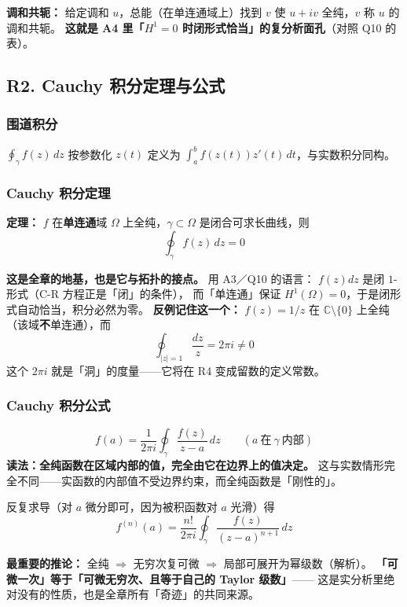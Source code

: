 \textbf{调和共轭：} 给定调和 $u$，总能（在单连通域上）找到 $v$ 使 $u+iv$ 全纯，$v$ 称 $u$ 的调和共轭。
\textbf{这就是 A4 里「$H^1=0$ 时闭形式恰当」的复分析面孔}（对照 Q10 的表）。

\subsection{R2. Cauchy 积分定理与公式}

\subsubsection{围道积分}

$\oint_\gamma f(z)\,dz$ 按参数化 $z(t)$ 定义为 $\int_a^b f(z(t))z'(t)\,dt$，与实数积分同构。

\subsubsection{Cauchy 积分定理}

\textbf{定理：} $f$ 在\textbf{单连通}域 $\Omega$ 上全纯，$\gamma\subset\Omega$ 是闭合可求长曲线，则
\[
\oint_\gamma f(z)\,dz=0
\]

\textbf{这是全章的地基，也是它与拓扑的接点。} 用 A3／Q10 的语言：
$f(z)dz$ 是闭 $1$-形式（C-R 方程正是「闭」的条件），
而「单连通」保证 $H^1(\Omega)=0$，于是闭形式自动恰当，积分必然为零。
\textbf{反例记住这一个：} $f(z)=1/z$ 在 $\mathbb C\setminus\{0\}$ 上全纯（该域\textbf{不}单连通），而
\[
\oint_{|z|=1}\frac{dz}{z}=2\pi i\ne0
\]
这个 $2\pi i$ 就是「洞」的度量——它将在 R4 变成留数的定义常数。

\subsubsection{Cauchy 积分公式}

\[
f(a)=\frac{1}{2\pi i}\oint_\gamma\frac{f(z)}{z-a}\,dz
\qquad(a\ \text{在}\ \gamma\ \text{内部})
\]
\textbf{读法：全纯函数在区域内部的值，完全由它在边界上的值决定。}
这与实数情形完全不同——实函数的内部值不受边界约束，而全纯函数是「刚性的」。

反复求导（对 $a$ 微分即可，因为被积函数对 $a$ 光滑）得
\[
f^{(n)}(a)=\frac{n!}{2\pi i}\oint_\gamma\frac{f(z)}{(z-a)^{n+1}}\,dz
\]

\textbf{最重要的推论：} 全纯 $\Longrightarrow$ 无穷次复可微 $\Longrightarrow$ 局部可展开为幂级数（解析）。
\textbf{「可微一次」等于「可微无穷次、且等于自己的 Taylor 级数」}——
这是实分析里绝对没有的性质，也是全章所有「奇迹」的共同来源。

